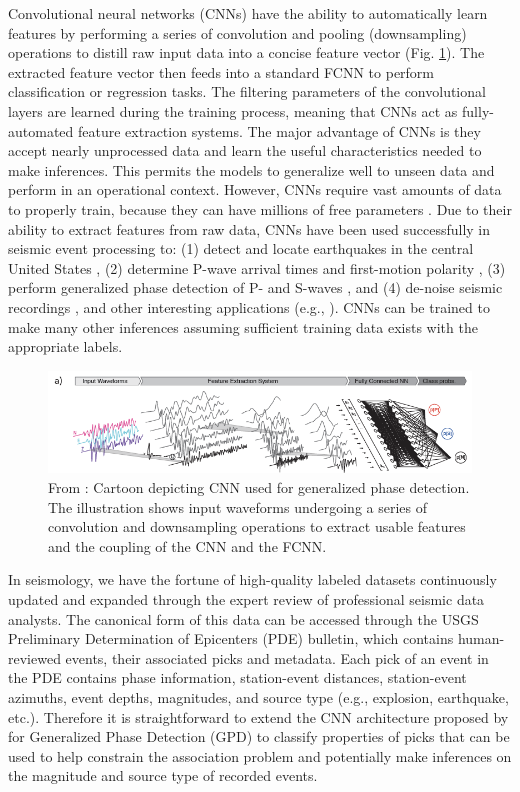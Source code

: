\documentclass[12p]{article}
\begin{document}
Convolutional neural networks (CNNs) have the ability to automatically learn features by performing a series of
convolution and pooling (downsampling) operations to distill raw input data into a concise feature vector (Fig.
\ref{fig:cnn}). The extracted feature vector then feeds into a standard FCNN to perform classification or regression
tasks. The filtering parameters of the convolutional layers are learned during the training process, meaning that CNNs
act as fully-automated feature extraction systems. The major advantage of CNNs is they accept nearly unprocessed data
and learn the useful characteristics needed to make inferences. This permits the models to generalize well to unseen
data and perform in an operational context. However, CNNs require vast amounts of data to properly train, because
they can have millions of free parameters \citep{Ross2018a}. Due to their ability to extract features from raw data,
CNNs have been used successfully in seismic event processing to: (1) detect and locate earthquakes in the central United
States \citep{Perol2018}, (2) determine P-wave arrival times and first-motion polarity \citep{Ross2018a}, (3) perform
generalized phase detection of P- and S-waves \citep{Ross2018b, Zhu2019a}, and (4) de-noise seismic recordings
\citep{Zhu2019b}, and other interesting applications (e.g., \citet{RouetLeduc2017, RouetLeduc2019}). CNNs can be trained
to make many other inferences assuming sufficient training data exists with the appropriate labels.

\begin{figure}[!htb]
  \center\includegraphics[width=\textwidth]{figures/cnn_architecture_ross2018a.png}
  \caption{\label{fig:cnn} From \cite{Ross2018b}: Cartoon depicting CNN used for generalized phase detection. The illustration shows input waveforms undergoing a series of convolution and downsampling operations to extract usable features and the coupling of the CNN and the FCNN.}
\end{figure}

In seismology, we have the fortune of high-quality labeled datasets continuously updated and expanded through the
expert review of professional seismic data analysts. The canonical form of this data can be accessed through the USGS
Preliminary Determination of Epicenters (PDE) bulletin, which contains human-reviewed events, their associated
picks and metadata. Each pick of an event in the PDE contains phase information, station-event distances, station-event
azimuths, event depths, magnitudes, and source type (e.g., explosion, earthquake, etc.). Therefore it is
straightforward to extend the CNN architecture proposed by \citet{Ross2018b} for Generalized Phase Detection (GPD) to
classify properties of picks that can be used to help constrain the association problem and potentially make inferences
on the magnitude and source type of recorded events.
\end{document}
